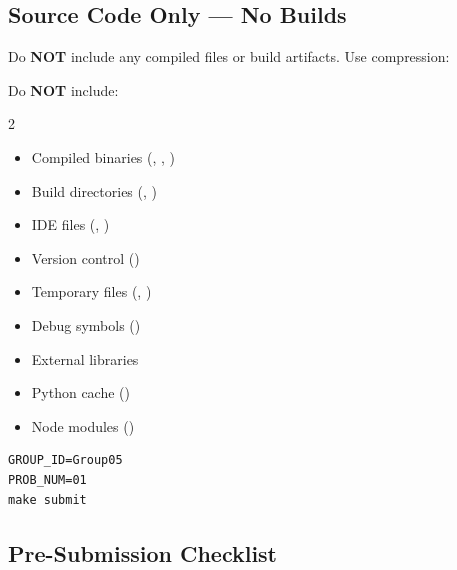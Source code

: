 \subsection{Source Code Only --- No Builds}

\begin{constraintbox}
Do \textbf{NOT} include any compiled files or build artifacts. Use compression: 
\end{constraintbox}

Do \textbf{NOT} include:

\begin{multicols}{2}
\begin{itemize}
  \item Compiled binaries (, , )
  \item Build directories (, )
  \item IDE files (, )
  \item Version control ()
  \item Temporary files (, )
  \item Debug symbols ()
  \item External libraries
  \item Python cache ()
  \item Node modules ()
\end{itemize}
\end{multicols}

\begin{lstlisting}[style=bash]
GROUP_ID=Group05
PROB_NUM=01
make submit
\end{lstlisting}

\subsection{Pre-Submission Checklist}

